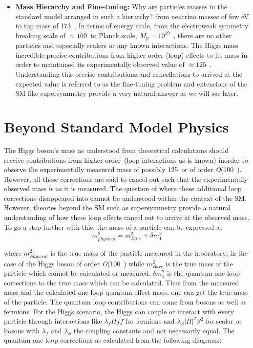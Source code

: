 \begin{itemize}
\item \textbf{Mass Hierarchy and Fine-tuning: }
Why are particles masses in the standard model arranged in such a hierarchy? from neutrino masses of few eV to top mass of 173~\GeV.
In terms of energy scale, from the electroweak symmetry breaking scale of $\approx 100$~\GeV to Planck scale, $M_{p} = 10^{19}$~\GeV, there are no other particles and especially scalers  or any known interactions.
The Higgs mass  incredible precise  contributions from higher order (loop) effects to its mass in order to maintained its experimentally observed value of $\approx 125$~\GeV. Understanding this precise contributions and cancellations to arrived at the expected value is referred to as the fine-tuning problem and extensions of the SM like supersymmetry provide a very natural answer as we will see later.
\end{itemize}

\section{Beyond Standard Model Physics}
The Higgs boson's mass as understood from theoretical calculations should receive contributions from higher order~(loop interactions as is known) inorder to observe the experimentally measured mass of possibly 125~\GeV or of order \textit{O}(100~\GeV). However, all these corrections are said to cancel out such that the experimentally observed mass is as it is measured. The question of where these additional loop corrections disappeared into cannot be understood within the context of the SM. However, theories beyond the SM such as supersymmetry provide a natural understanding of how these loop effects cancel out to arrive at the observed mass. To go a step further with this; the mass of a particle can be expressed as 
\begin{equation}
 m^{2}_{physical} = m^{2}_{Bare} + \delta m^{2}_{1}
\end{equation}

where $m^{2}_{Physical}$ is the true mass of the particle measured in the laboratory; in the case of the Higgs boson of order \textit{O}(100~\GeV) while $m^{2}_{Bare}$ is the true mass of the particle which cannot be calculated or measured. $\delta m^{2}_{1}$ is the quantum one loop corrections to the true mass which can be calculated. Thus from the measured mass and the calculated  one loop quantum effect mass, one can get the true mass of the particle. The quantum loop contributions can come from bosons as well as fermions. For the Higgs scenario, the Higgs can couple or interact with every particle through interactions like $\lambda_{f}H\bar{f}f$ for fermions and $\lambda_{S}|H|^{2}S^{2}$ for scalar or bosons  with $\lambda_{f}$ and $\lambda_{S}$ the coupling constants and not necessarily equal. The quantum one loop corrections as calculated from the following diagrams:

